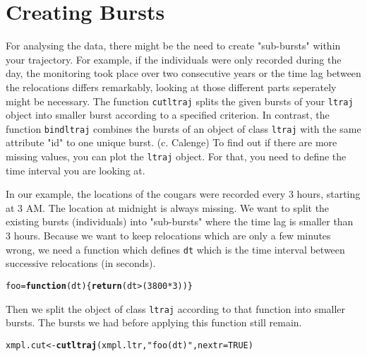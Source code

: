 \documentclass{article}\usepackage[]{graphicx}\usepackage[]{color}
\makeatletter
\newcommand{\hlnum}[1]{\textcolor[rgb]{0.686,0.059,0.569}{#1}}%
\newcommand{\hlstr}[1]{\textcolor[rgb]{0.192,0.494,0.8}{#1}}%
\newcommand{\hlopt}[1]{\textcolor[rgb]{0,0,0}{#1}}%
\newcommand{\hlstd}[1]{\textcolor[rgb]{0.345,0.345,0.345}{#1}}%
\newcommand{\hlkwa}[1]{\textcolor[rgb]{0.161,0.373,0.58}{\textbf{#1}}}%
\newcommand{\hlkwb}[1]{\textcolor[rgb]{0.69,0.353,0.396}{#1}}%
\newcommand{\hlkwc}[1]{\textcolor[rgb]{0.333,0.667,0.333}{#1}}%
\newcommand{\hlkwd}[1]{\textcolor[rgb]{0.737,0.353,0.396}{\textbf{#1}}}%
\newenvironment{kframe}{%
 \def\at@end@of@kframe{}%
 \ifinner\ifhmode%
  \def\at@end@of@kframe{\end{minipage}}%
  \begin{minipage}{\columnwidth}%
 \fi\fi%
 \def\FrameCommand##1{\hskip\@totalleftmargin \hskip-\fboxsep
 \colorbox{shadecolor}{##1}\hskip-\fboxsep
     \hskip-\linewidth \hskip-\@totalleftmargin \hskip\columnwidth}%
 \MakeFramed {\advance\hsize-\width
   \@totalleftmargin\z@ \linewidth\hsize
   \@setminipage}}%
 {\par\unskip\endMakeFramed%
 \at@end@of@kframe}
\newenvironment{knitrout}{}{} %
\makeatother
\begin{document}







\section{Creating Bursts}%

For analysing the data, there might be the need to create "sub-bursts" within your trajectory. For example, if the individuals were only recorded during the day, the monitoring took place over two consecutive years or the time lag between the relocations differs remarkably, looking at those different parts seperately might be necessary. The function \texttt{cutltraj} splits the given bursts of your \texttt{ltraj} object into smaller burst according to a specified criterion. In contrast, the function \texttt{bindltraj} combines the bursts of an object of class \texttt{ltraj} with the same attribute "id" to one unique burst. (c. Calenge)
To find out if there are more missing values, you can plot the \texttt{ltraj} object. For that, you need to define the time interval you are looking at. 



In our example, the locations of the cougars were recorded every 3 hours, starting at 3 AM. The location at midnight is always missing. We want to split the existing bursts (individuals) into "sub-bursts" where the time lag is smaller than 3 hours. Because we want to keep relocations which are only a few minutes wrong, we need a function which defines \texttt{dt} which is the time interval between successive relocations (in seconds).

\begin{knitrout}
\color{fgcolor}\begin{kframe}
\begin{alltt}
\hlstd{foo} \hlkwb{=} \hlkwa{function}\hlstd{(}\hlkwc{dt}\hlstd{) \{}\hlkwd{return}\hlstd{(dt}\hlopt{>} \hlstd{(}\hlnum{3800}\hlopt{*}\hlnum{3}\hlstd{))\}}
\end{alltt}
\end{kframe}
\end{knitrout}
Then we split the object of class \texttt{ltraj} according to that function into smaller bursts. The bursts we had before applying this function still remain.
\begin{knitrout}
\color{fgcolor}\begin{kframe}
\begin{alltt}
\hlstd{xmpl.cut} \hlkwb{<-} \hlkwd{cutltraj}\hlstd{(xmpl.ltr,} \hlstr{"foo(dt)"}\hlstd{,} \hlkwc{nextr} \hlstd{=} \hlnum{TRUE}\hlstd{)}
\end{alltt}
\end{kframe}
\end{knitrout}
\end{document}
